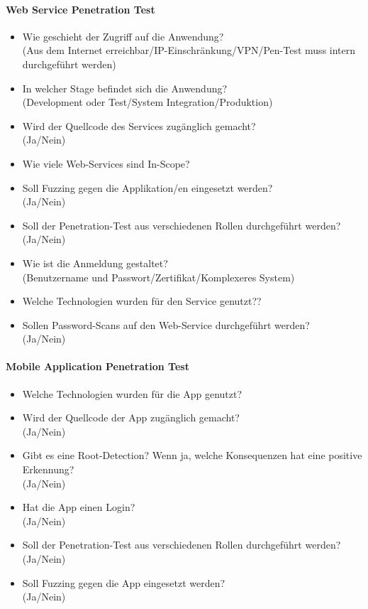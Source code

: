 \paragraph{Web Service Penetration Test}
\begin{itemize}
	\item Wie geschieht der Zugriff auf die Anwendung?\\
	(Aus dem Internet erreichbar/IP-Einschränkung/VPN/Pen-Test muss intern durchgeführt werden)
	\item In welcher Stage befindet sich die Anwendung?\\
	(Development oder Test/System Integration/Produktion)
	\item Wird der Quellcode des Services zugänglich gemacht? \\
	(Ja/Nein)
	\item Wie viele Web-Services sind In-Scope?
	\item Soll Fuzzing gegen die Applikation/en eingesetzt werden?\\
	(Ja/Nein)
	\item Soll der Penetration-Test aus verschiedenen Rollen durchgeführt werden?\\
	(Ja/Nein)
	\item  Wie ist die Anmeldung gestaltet?\\
	(Benutzername und Passwort/Zertifikat/Komplexeres System)
	\item Welche Technologien wurden für den Service genutzt??
	\item Sollen Password-Scans auf den Web-Service durchgeführt werden?\\
	(Ja/Nein)
\end{itemize}

\paragraph{Mobile Application Penetration Test}
\begin{itemize}
	\item Welche Technologien wurden für die App genutzt?
	\item Wird der Quellcode der App zugänglich gemacht?\\
	(Ja/Nein)
	\item Gibt es eine Root-Detection? Wenn ja, welche Konsequenzen hat eine positive Erkennung?\\
	(Ja/Nein)
	\item Hat die App einen Login?\\
	(Ja/Nein)
	\item Soll der Penetration-Test aus verschiedenen Rollen durchgeführt werden?\\
	(Ja/Nein)
	\item Soll Fuzzing gegen die App eingesetzt werden?\\
	(Ja/Nein)
\end{itemize}

